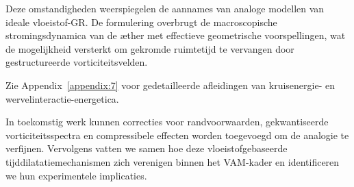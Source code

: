 Deze omstandigheden weerspiegelen de aannames van analoge modellen van ideale vloeistof-GR. De formulering overbrugt de macroscopische stromingsdynamica van de æther met effectieve geometrische voorspellingen, wat de mogelijkheid versterkt om gekromde ruimtetijd te vervangen door gestructureerde vorticiteitsvelden.

Zie Appendix~\ref{appendix:7} voor gedetailleerde afleidingen van kruisenergie- en wervelinteractie-energetica.

In toekomstig werk kunnen correcties voor randvoorwaarden, gekwantiseerde vorticiteitsspectra en compressibele effecten worden toegevoegd om de analogie te verfijnen. Vervolgens vatten we samen hoe deze vloeistofgebaseerde tijddilatatiemechanismen zich verenigen binnen het VAM-kader en identificeren we hun experimentele implicaties.